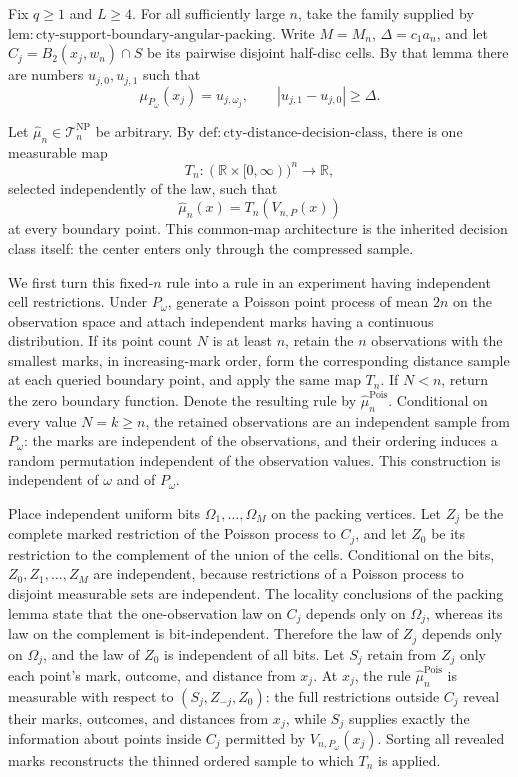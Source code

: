 Fix \(q\geq1\) and \(L\geq4\).  For all sufficiently large \(n\), take the family supplied by \(\mathrm{lem:cty\text{-}support\text{-}boundary\text{-}angular\text{-}packing}\).  Write \(M=M_n\), \(\Delta=c_1a_n\), and let \(C_j=B_2(x_j,w_n)\cap S\) be its pairwise disjoint half-disc cells.  By that lemma there are numbers \(u_{j,0},u_{j,1}\) such that
\[
 \mu_{P_\omega}(x_j)=u_{j,\omega_j},
 \qquad |u_{j,1}-u_{j,0}|\geq\Delta.
\]

Let \(\widehat\mu_n\in\mathcal T_n^{\mathrm{NP}}\) be arbitrary.  By \(\mathrm{def:cty\text{-}distance\text{-}decision\text{-}class}\), there is one measurable map
\[
 T_n:(\mathbb R\times[0,\infty))^n\longrightarrow\mathbb R,
\]
selected independently of the law, such that
\[
 \widehat\mu_n(x)=T_n(V_{n,P}(x))
\]
at every boundary point.  This common-map architecture is the inherited decision class itself: the center enters only through the compressed sample.

We first turn this fixed-\(n\) rule into a rule in an experiment having independent cell restrictions.  Under \(P_\omega\), generate a Poisson point process of mean \(2n\) on the observation space and attach independent marks having a continuous distribution.  If its point count \(N\) is at least \(n\), retain the \(n\) observations with the smallest marks, in increasing-mark order, form the corresponding distance sample at each queried boundary point, and apply the same map \(T_n\).  If \(N<n\), return the zero boundary function.  Denote the resulting rule by \(\widehat\mu_n^{\mathrm{Pois}}\).  Conditional on every value \(N=k\geq n\), the retained observations are an independent sample from \(P_\omega\): the marks are independent of the observations, and their ordering induces a random permutation independent of the observation values.  This construction is independent of \(\omega\) and of \(P_\omega\).

Place independent uniform bits \(\Omega_1,\ldots,\Omega_M\) on the packing vertices.  Let \(Z_j\) be the complete marked restriction of the Poisson process to \(C_j\), and let \(Z_0\) be its restriction to the complement of the union of the cells.  Conditional on the bits, \(Z_0,Z_1,\ldots,Z_M\) are independent, because restrictions of a Poisson process to disjoint measurable sets are independent.  The locality conclusions of the packing lemma state that the one-observation law on \(C_j\) depends only on \(\Omega_j\), whereas its law on the complement is bit-independent.  Therefore the law of \(Z_j\) depends only on \(\Omega_j\), and the law of \(Z_0\) is independent of all bits.  Let \(S_j\) retain from \(Z_j\) only each point's mark, outcome, and distance from \(x_j\).  At \(x_j\), the rule \(\widehat\mu_n^{\mathrm{Pois}}\) is measurable with respect to \((S_j,Z_{-j},Z_0)\): the full restrictions outside \(C_j\) reveal their marks, outcomes, and distances from \(x_j\), while \(S_j\) supplies exactly the information about points inside \(C_j\) permitted by \(V_{n,P_\omega}(x_j)\).  Sorting all revealed marks reconstructs the thinned ordered sample to which \(T_n\) is applied.

